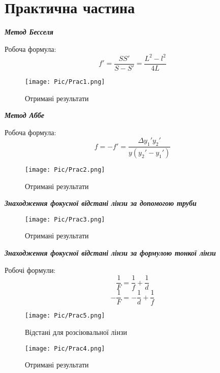 \section{Практична частина}
\setlength{\parindent}{4em}
\begin{center}
  {\textbf{\emph{Метод Бесселя}}}
\end{center}
Робоча формула:
$$f' = \frac{SS'}{S-S'} = \frac{L^2 - l^2}{4L}$$
\begin{figure}[ht]

\centering

\texttt{[image: Pic/Prac1.png]}

\caption{Отримані результати}

\label{Prac1}

\end{figure}
\begin{center}
  {\textbf{\emph{Метод Аббе}}}
\end{center}
Робоча формула:
$$f=-f'=\frac{\Delta y_1' y_2'}{y(y_2'-y_1')}$$
\begin{figure}[ht]

\centering

\texttt{[image: Pic/Prac2.png]}

\caption{Отримані результати}

\label{Prac2}

\end{figure}
\begin{center}
  {\textbf{\emph{Знаходження фокусної відстані лінзи за допомогою труби}}}
\end{center}
\begin{figure}[ht]

\centering

\texttt{[image: Pic/Prac3.png]}

\caption{Отримані результати}

\label{Prac3}

\end{figure}

\newpage
\begin{center}
  {\textbf{\emph{Знаходження фокусної відстані лінзи за формулою тонкої лінзи}}}
\end{center}
Робочі формули:
$$\frac{1}{F} = \frac{1}{f}+\frac{1}{d}$$
$$-\frac{1}{F} = -\frac{1}{d}+\frac{1}{f}$$
\begin{figure}[ht]

\centering

\texttt{[image: Pic/Prac5.png]}

\caption{Відстані для розсіювальної лінзи}

\label{Prac5}

\end{figure}
\begin{figure}[ht]

\centering

\texttt{[image: Pic/Prac4.png]}

\caption{Отримані результати}

\label{Prac4}

\end{figure}
\newpage
